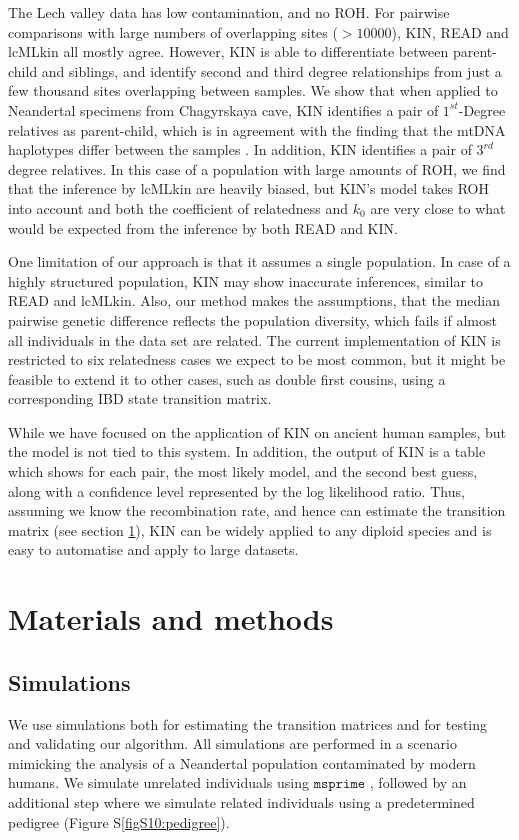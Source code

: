 \documentclass[12pt, letterpaper]{article}
\begin{document}
The Lech valley data  has low contamination, and no ROH. For pairwise comparisons with large numbers of overlapping sites ($>10000$), KIN, READ and lcMLkin all mostly agree. However, KIN is able to differentiate between parent-child and siblings, and identify second and third degree relationships from just a few thousand sites overlapping between samples. We show that when applied to Neandertal specimens from Chagyrskaya cave, KIN identifies a pair of $1^{st}$-Degree relatives as parent-child, which is in agreement with the finding that the mtDNA haplotypes differ between the samples \cite{laurits_skov_genetic_nodate}. In addition, KIN identifies a pair of $3^{rd}$ degree relatives. In this case of a population with large amounts of ROH, we find that the inference by lcMLkin are heavily biased, but KIN's model takes ROH into account and both the coefficient of relatedness and $k_0$ are very close to what would be expected from the inference by both READ and KIN. 

One limitation of our approach is that it assumes a single population. In case of a highly structured population, KIN may show inaccurate inferences, similar to READ and lcMLkin. Also, our method makes the assumptions, that the median pairwise genetic difference reflects the population diversity, which fails if almost all individuals in the data set are related. The current implementation of KIN is restricted to six relatedness cases we expect to be most common, but it might be feasible to extend it to other cases, such as double first cousins, using a corresponding IBD state transition matrix.

While we have focused on the application of KIN on ancient human samples, but the model is not tied to this system. In addition, the output of KIN is a table which shows for each pair, the most likely model, and the second best guess, along with a confidence level represented by the log likelihood ratio. Thus, assuming we know the recombination rate, and hence can estimate the transition matrix (see section \ref{method}), KIN can be widely applied to any diploid species and is easy to automatise and apply to large datasets. 


\section{Materials and methods}\label{method}

\subsection{Simulations}\label{simulat}
We use simulations both for estimating the transition matrices and for testing and validating our algorithm. All simulations are performed in a scenario mimicking the analysis of a Neandertal population contaminated by modern humans. We simulate unrelated individuals using $\texttt{msprime}$ \cite{kelleher_efficient_2016}, followed by an additional step where we simulate related individuals using a predetermined pedigree (Figure S\ref{figS10:pedigree}).
\end{document}

